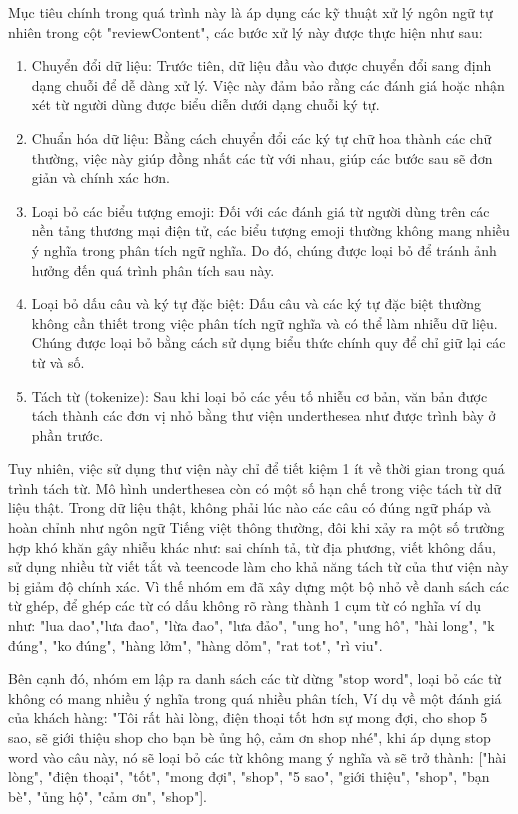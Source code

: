 Mục tiêu chính trong quá trình này là áp dụng các kỹ thuật xử lý ngôn ngữ tự nhiên trong cột "reviewContent", các bước xử lý này được thực hiện như sau:

\begin{enumerate}
    \item Chuyển đổi dữ liệu: Trước tiên, dữ liệu đầu vào được chuyển đổi sang định dạng chuỗi để dễ dàng xử lý. Việc này đảm bảo rằng các đánh giá hoặc nhận xét từ người dùng được biểu diễn dưới dạng chuỗi ký tự.
    \item Chuẩn hóa dữ liệu: Bằng cách chuyển đổi các ký tự chữ hoa thành các chữ thường, việc này giúp đồng nhất các từ với nhau, giúp các bước sau sẽ đơn giản và chính xác hơn.
    \item Loại bỏ các biểu tượng emoji: Đối với các đánh giá từ người dùng trên các nền tảng thương mại điện tử, các biểu tượng emoji thường không mang nhiều ý nghĩa trong phân tích ngữ nghĩa. Do đó, chúng được loại bỏ để tránh ảnh hưởng đến quá trình phân tích sau này.
    \item Loại bỏ dấu câu và ký tự đặc biệt: Dấu câu và các ký tự đặc biệt thường không cần thiết trong việc phân tích ngữ nghĩa và có thể làm nhiễu dữ liệu. Chúng được loại bỏ bằng cách sử dụng biểu thức chính quy để chỉ giữ lại các từ và số.
    \item Tách từ (tokenize): Sau khi loại bỏ các yếu tố nhiễu cơ bản, văn bản được tách thành các đơn vị nhỏ bằng thư viện underthesea như được trình bày ở phần trước.
\end{enumerate}

Tuy nhiên, việc sử dụng thư viện này chỉ để tiết kiệm 1 ít về thời gian trong quá trình tách từ. Mô hình underthesea còn có một số hạn chế trong việc tách từ dữ liệu thật. Trong dữ liệu thật, không phải lúc nào các câu có đúng ngữ pháp và hoàn chỉnh như ngôn ngữ Tiếng việt thông thường, đôi khi xảy ra một số trường hợp khó khăn gây nhiễu khác như: sai chính tả, từ địa phương, viết không dấu, sử dụng nhiều từ viết tắt và teencode làm cho khả năng tách từ của thư viện này bị giảm độ chính xác. Vì thế nhóm em đã xây dựng một bộ nhỏ về danh sách các từ ghép, để ghép các từ có dấu không rõ ràng thành 1 cụm từ có nghĩa ví dụ như: "lua dao","lưa đao", "lừa đao", "lưa đảo", "ung ho", "ung hô", "hài long", "k đúng", "ko đúng", "hàng lởm", "hàng dỏm", "rat tot", "rì viu".

Bên cạnh đó, nhóm em lập ra danh sách các từ dừng "stop word", loại bỏ các từ không có mang nhiều ý nghĩa trong quá nhiều phân tích, Ví dụ về một đánh giá của khách hàng: "Tôi rất hài lòng, điện thoại tốt hơn sự mong đợi, cho shop 5 sao, sẽ giới thiệu shop cho bạn bè ủng hộ, cảm ơn shop nhé", khi áp dụng stop word vào câu này, nó sẽ loại bỏ các từ không mang ý nghĩa và sẽ trở thành: ["hài lòng", "điện thoại", "tốt", "mong đợi", "shop", "5 sao", "giới thiệu", "shop", "bạn bè", "ủng hộ", "cảm ơn", "shop"].

